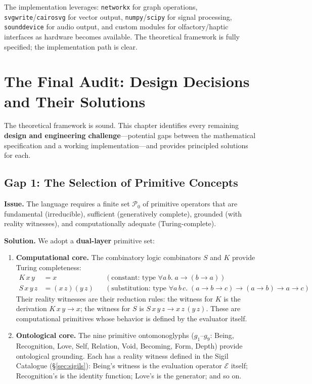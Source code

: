 \documentclass[12pt, letterpaper]{book}
\def\mathfrak#1{#1}%
\begin{document}
The implementation leverages: \texttt{networkx} for graph operations, \texttt{svgwrite}/\texttt{cairosvg} for vector output, \texttt{numpy}/\texttt{scipy} for signal processing, \texttt{sounddevice} for audio output, and custom modules for olfactory/haptic interfaces as hardware becomes available. The theoretical framework is fully specified; the implementation path is clear.


\chapter{The Final Audit: Design Decisions and Their Solutions}

The theoretical framework is sound. This chapter identifies every remaining \textbf{design and engineering challenge}---potential gaps between the mathematical specification and a working implementation---and provides principled solutions for each.

\section{Gap 1: The Selection of Primitive Concepts}

\textbf{Issue.} The language requires a finite set $\mathcal{P}_0$ of primitive operators that are fundamental (irreducible), sufficient (generatively complete), grounded (with reality witnesses), and computationally adequate (Turing-complete).

\textbf{Solution.} We adopt a \textbf{dual-layer} primitive set:

\begin{enumerate}[label=(\roman*)]
    \item \textbf{Computational core.} The combinatory logic combinators $S$ and $K$ provide Turing completeness:
    \begin{align*}
    K\,x\,y &= x & &(\text{constant: type } \forall a\,b.\; a \to (b \to a)) \\
    S\,x\,y\,z &= (x\,z)(y\,z) & &(\text{substitution: type } \forall a\,b\,c.\; (a \to b \to c) \to (a \to b) \to a \to c)
    \end{align*}
    Their reality witnesses are their reduction rules: the witness for $K$ is the derivation $K\,x\,y \to x$; the witness for $S$ is $S\,x\,y\,z \to x\,z\,(y\,z)$. These are computational primitives whose behavior is defined by the evaluator itself.

    \item \textbf{Ontological core.} The nine primitive ontomonoglyphs ($\mathfrak{g}_1$--$\mathfrak{g}_9$: Being, Recognition, Love, Self, Relation, Void, Becoming, Form, Depth) provide ontological grounding. Each has a reality witness defined in the Sigil Catalogue (\S\ref{sec:sigils}): Being's witness is the evaluation operator $\mathcal{E}$ itself; Recognition's is the identity function; Love's is the generator; and so on.
\end{enumerate}
\end{document}
